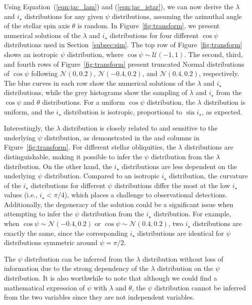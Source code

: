 \documentclass[twocolumn,times]{aastex631}
\begin{document}
Using Equation~(\ref{eqn:jac_lam}) and (\ref{eqn:jac_istar}), we can now derive the $\lambda$ and $i_\star$ distributions for any given $\psi$ distributions, assuming the azimuthal angle of the stellar spin axis $\theta$ is random. In Figure~\ref{fig:transform}, we present numerical solutions of the $\lambda$ and $i_\star$ distributions for four different $\cos{\psi}$ distributions used in Section~\ref{subsec:sim}. The top row of Figure~\ref{fig:transform} shows an isotropic $\psi$ distribution, where $\cos{\psi} \sim \mathcal{U}(-1,1)$. The second, third, and fourth rows of Figure~\ref{fig:transform} present truncated Normal distributions of $\cos{\psi}$ following $\mathcal{N}(0,0.2)$, $\mathcal{N}(-0.4,0.2)$, and $\mathcal{N}(0.4,0.2)$, respectively.
The blue curves in each row show the numerical solutions of the $\lambda$ and $i_\star$ distributions, while the grey histograms show the sampling of $\lambda$ and $i_\star$ from the $\cos{\psi}$ and $\theta$ distributions. 
For a uniform $\cos{\psi}$ distribution, the $\lambda$ distribution is uniform, and the $i_\star$ distribution is isotropic, proportional to $\sin{i_\star}$, as expected.

Interestingly, the $\lambda$ distribution is closely related to and sensitive to the underlying $\psi$ distribution, as demonstrated in the  and  columns in Figure~\ref{fig:transform}. For different stellar obliquities, the $\lambda$ distributions are distinguishable, making it possible to infer the $\psi$ distribution from the $\lambda$ distribution. On the other hand, the $i_\star$ distributions are less dependent on the underlying $\psi$ distribution. Compared to an isotropic $i_\star$ distribution, the curvature of the $i_\star$ distributions for different $\psi$ distributions differ the most at the low $i_\star$ values (i.e., $i_\star < \pi/4$), which places a challenge to observational detections. 
Additionally, the degeneracy of the solution could be a significant issue when attempting to infer the $\psi$ distribution from the $i_\star$ distribution. For example, when $\cos{\psi} \sim \mathcal{N}(-0.4,0.2)$ or $\cos{\psi} \sim \mathcal{N}(0.4,0.2)$, two $i_\star$ distributions are exactly the same, since the corresponding $i_\star$ distributions are identical for $\psi$ distributions symmetric around $\psi = \pi/2$.

The $\psi$ distribution can be inferred from the $\lambda$ distribution without loss of information due to the strong dependency of the $\lambda$ distribution on the $\psi$ distribution. It is also worthwhile to note that although we could find a mathematical expression of $\psi$ with $\lambda$ and $\theta$, the $\psi$ distribution cannot be inferred from the two variables since they are not independent variables.
\end{document}
